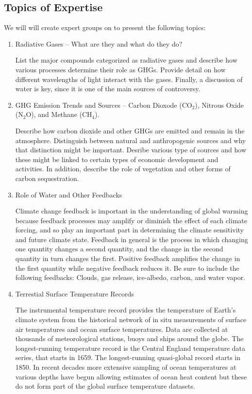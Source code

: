 \documentclass{article}\usepackage[]{graphicx}\usepackage[]{color}
\begin{document}
\subsection{Topics of Expertise}

We will will create expert groups on to present the following topics:

\begin{enumerate}
  \item Radiative Gases -- What are they and what do they do?
  
List the major compounds categorized as radiative gases and describe how various processes determine their role as GHGs. Provide detail on how different wavelengths of light interact with the gases. Finally, a discussion of water is key, since it is one of the main sources of controversy. 
  
  \item GHG Emission Trends and Sources -- Carbon Dioxode (CO$_2$), Nitrous Oxide (N$_2$O), and Methane (CH$_4$).

Describe how carbon dioxide and other GHGs are emitted and remain in the atmosphere. Distinguish between natural and anthropogenic sources and why that distinction might be important. Desribe various type of sources and how these might be linked to certain types of economic development and activities. In addition, describe the role of vegetation and other forms of carbon sequestration.

  \item Role of Water and Other Feedbacks
  
Climate change feedback is important in the understanding of global warming because feedback processes may amplify or diminish the effect of each climate forcing, and so play an important part in determining the climate sensitivity and future climate state. Feedback in general is the process in which changing one quantity changes a second quantity, and the change in the second quantity in turn changes the first. Positive feedback amplifies the change in the first quantity while negative feedback reduces it. Be sure to include the following feedbacks: Clouds, gas release, ice-albedo, carbon, and water vapor.

  \item Terrestial Surface Temperature Records
  
The instrumental temperature record provides the temperature of Earth's climate system from the historical network of in situ measurements of surface air temperatures and ocean surface temperatures. Data are collected at thousands of meteorological stations, buoys and ships around the globe. The longest-running temperature record is the Central England temperature data series, that starts in 1659. The longest-running quasi-global record starts in 1850. In recent decades more extensive sampling of ocean temperatures at various depths have begun allowing estimates of ocean heat content but these do not form part of the global surface temperature datasets.
  

\end{enumerate}
\end{document}
